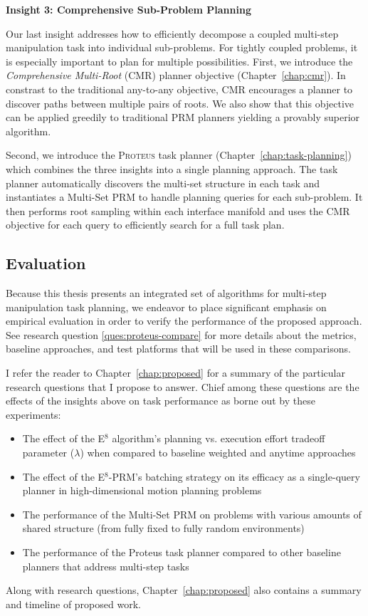 \vspace{0.1in}
\noindent
\textbf{Insight 3: Comprehensive Sub-Problem Planning}

Our last insight addresses how to efficiently decompose a coupled
multi-step manipulation task into individual sub-problems.
For tightly coupled problems,
it is especially important to plan for multiple possibilities.
First, we introduce the \emph{Comprehensive Multi-Root} (CMR) planner
objective (Chapter~\ref{chap:cmr}).
In constrast to the traditional any-to-any objective,
CMR encourages a planner to discover paths between multiple pairs of
roots.
We also show that this objective can be applied greedily
to traditional PRM planners
yielding a provably superior algorithm. 

Second,
we introduce the \textsc{Proteus} task planner
(Chapter~\ref{chap:task-planning})
which combines the three insights into a single planning approach.
The task planner
automatically discovers the multi-set structure in each task
and instantiates a Multi-Set PRM to handle planning queries
for each sub-problem.
It then performs root sampling within each interface manifold
and uses the CMR objective for each query to
efficiently search for a full task plan.

\subsection*{Evaluation}

Because this thesis presents an integrated set of algorithms
for multi-step manipulation task planning,
we endeavor to place significant emphasis on empirical evaluation
in order to verify the performance of the proposed approach.
See research question \ref{ques:proteus-compare} for more details
about the metrics, baseline approaches, and test platforms
that will be used in these comparisons.

I refer the reader to Chapter~\ref{chap:proposed} for a summary
of the particular research questions that I propose to answer.
Chief among these questions are the effects of the insights above
on task performance as borne out by these experiments:
\begin{itemize}
\item The effect of the E$^8$ algorithm's planning vs. execution
   effort tradeoff parameter ($\lambda$)
   when compared to baseline weighted and anytime approaches
\item The effect of the E$^8$-PRM's batching strategy on its efficacy
   as a single-query planner in high-dimensional motion planning
   problems
\item The performance of the Multi-Set PRM on problems with various
   amounts of shared structure
   (from fully fixed to fully random environments)
\item The performance of the Proteus task planner
   compared to other baseline planners that address multi-step tasks
\end{itemize}
Along with research questions,
Chapter~\ref{chap:proposed} also contains
a summary and timeline of proposed work.

